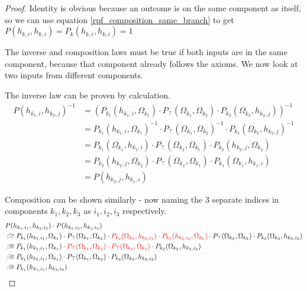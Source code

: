 \documentclass[twoside]{article}
\theoremstyle{plain}%
\theoremstyle{definition}
\theoremstyle{remark}
\begin{document}
\begin{proof}
Identity is obvious because an outcome is on the same component as itself, so we can use equation \ref{rpf_composition_same_branch} to get \(P(h_{k, i}, h_{k, i}) = P_k(h_{k, i}, h_{k, i}) = 1\)

The inverse and composition laws must be true if both inputs are in the same component, because that component already follows the axioms. We now look at two inputs from different components.

The inverse law can be proven by calculation.
\begin{equation}
\begin{aligned}
P(h_{k_1, i}, h_{k_2, j})^{-1} &= (P_{k_1}(h_{k_1, i}, \Omega_{k_1}) \cdot  P_{\top}(\Omega_{k_1}, \Omega_{k_2}) \cdot P_{k_2}(\Omega_{k_2}, h_{k_2, j}))^{-1} \\
& = P_{k_1}(h_{k_1, i}, \Omega_{k_1})^{-1} \cdot  P_{\top}(\Omega_{k_1}, \Omega_{k_2})^{-1} \cdot P_{k_2}(\Omega_{k_2}, h_{k_2, j})^{-1} \\
& = P_{k_1}(\Omega_{k_1}, h_{k_1, i}) \cdot  P_{\top}(\Omega_{k_2}, \Omega_{k_1}) \cdot P_{k_2}(h_{k_2, j}, \Omega_{k_2}) \\
& = P_{k_2}(h_{k_2, j}, \Omega_{k_2})\cdot  P_{\top}(\Omega_{k_2}, \Omega_{k_1}) \cdot P_{k_1}(\Omega_{k_1}, h_{k_1, i}) \\
& = P(h_{k_2, j}, h_{k_1, i})
\end{aligned}
\end{equation}

Composition can be shown similarly - now naming the 3 separate indices in components \(k_1, k_2, k_3\) as \(i_1, i_2, i_3\) respectively.
\begin{equation}
\begin{aligned}
& P(h_{k_1, i_1}, h_{k_2, i_2}) \cdot P(h_{k_2, i_2}, h_{k_3, i_3}) \\
& :\cong P_{k_1}(h_{k_1, i_1}, \Omega_{k_1}) \cdot  P_{\top}(\Omega_{k_1}, \Omega_{k_2}) \cdot \textcolor{red}{P_{k_2}(\Omega_{k_2}, h_{k_2, i_2}) \cdot  P_{k_2}(h_{k_2, i_2}, \Omega_{k_2})} \cdot  P_{\top}(\Omega_{k_2}, \Omega_{k_3}) \cdot P_{k_3}(\Omega_{k_3}, h_{k_3, i_3}) \\
& :\cong P_{k_1}(h_{k_1, i_1}, \Omega_{k_1}) \cdot  \textcolor{red}{P_{\top}(\Omega_{k_1}, \Omega_{k_2}) \cdot  P_{\top}(\Omega_{k_2}, \Omega_{k_3})} \cdot P_{k_3}(\Omega_{k_3}, h_{k_3, i_3}) \\
& :\cong P_{k_1}(h_{k_1, i_1}, \Omega_{k_1}) \cdot  P_{\top}(\Omega_{k_1}, \Omega_{k_3}) \cdot P_{k_3}(\Omega_{k_3}, h_{k_3, i_3}) \\
& :\cong P_{k_1}(h_{k_1, i_1}, h_{k_3, i_3})
\end{aligned}
\end{equation}
\end{proof}
\end{document}
